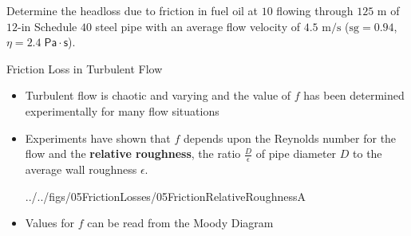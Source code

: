 \documentclass[9pt,xcolor={svgnames, x11names},professionalfonts, mathserif]{beamer}
\begin{document}
\begin{frame}
	\begin{cmini}[0.6]{
			\begin{myexam}{}{}
				\raggedright
				Determine the headloss due to friction in fuel oil at $10$\textcelsius{} flowing through $125\text{ m}$
				of $12$-in Schedule $40$ steel pipe with an average flow velocity of $4.5\text{ m/s}$ \lb
				($\text{sg}=0.94$, $\eta=2.4\;\mathsf{Pa\cdot s}$).
				\parm
			\end{myexam}
		}
	\end{cmini}
\end{frame}

\begin{frame}{Friction Loss in Turbulent Flow}
	
	\begin{itemize}
		\item Turbulent flow is chaotic and varying and the value of $f$ has been determined experimentally
		      for many flow situations
		\item Experiments have shown that $f$ depends upon the Reynolds number for the flow and the \textbf{relative roughness},
		      the ratio $\tfrac{D}{\epsilon}$ of pipe diameter $D$ to the average wall roughness $\epsilon$.\par\medskip
		      \begin{cfig}[0.45]{../../figs/05FrictionLosses/05FrictionRelativeRoughnessA}\end{cfig}
		\item Values for $f$ can be read from the Moody Diagram
	\end{itemize}
\end{frame}
\end{document}
